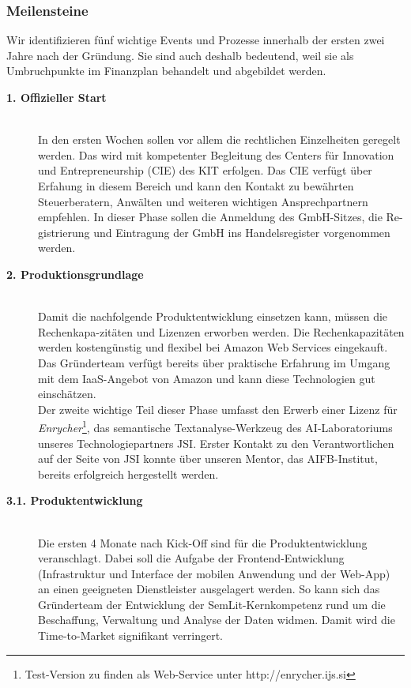 \subsubsection{Meilensteine}
Wir identifizieren fünf wichtige Events und Prozesse innerhalb der ersten zwei Jahre nach der Gründung. Sie sind auch deshalb bedeutend, weil sie als Umbruchpunkte im Finanzplan behandelt und abgebildet werden.\\
\begin{description}
  \item[\textbf{1. Offizieller Start}] \hfill \\
In den ersten Wochen sollen vor allem die rechtlichen Einzelheiten geregelt werden. Das wird mit kompetenter Begleitung des Centers für Innovation und Entrepreneurship (CIE) des KIT erfolgen. Das CIE verfügt über Erfahung in diesem Bereich und kann den Kontakt zu bewährten Steuerberatern, Anwälten und weiteren wichtigen Ansprechpartnern empfehlen. In dieser Phase sollen die Anmeldung des GmbH-Sitzes, die Re-gistrierung und Eintragung der GmbH ins Handelsregister vorgenommen werden. 
\\
  \item[\textbf{2. Produktionsgrundlage}] \hfill \\
Damit die nachfolgende Produktentwicklung einsetzen kann, müssen die Rechenkapa-zitäten und Lizenzen erworben werden. Die Rechenkapazitäten werden kostengünstig und flexibel bei {\color{orange}Amazon Web Services} eingekauft. Das Gründerteam verfügt bereits über praktische Erfahrung im Umgang mit dem IaaS-Angebot von Amazon und kann diese Technologien gut einschätzen. 
\\
Der zweite wichtige Teil dieser Phase umfasst den Erwerb einer Lizenz für \emph{Enrycher}\footnote[3]{Test-Version zu finden als Web-Service unter http://enrycher.ijs.si}, das semantische Textanalyse-Werkzeug des AI-Laboratoriums unseres Technologiepartners JSI. Erster Kontakt zu den Verantwortlichen auf der Seite von JSI konnte über unseren Mentor, das AIFB-Institut, bereits erfolgreich hergestellt werden.
\\
  \item[\textbf{3.1. Produktentwicklung}] \hfill \\
Die ersten 4 Monate nach Kick-Off sind für die Produktentwicklung veranschlagt. Dabei soll die Aufgabe der Frontend-Entwicklung (Infrastruktur und Interface der mobilen Anwendung und der Web-App) an einen geeigneten Dienstleister ausgelagert werden. So kann sich das Gründerteam der Entwicklung der SemLit-Kernkompetenz rund um die Beschaffung, Verwaltung und Analyse der Daten widmen. Damit wird die Time-to-Market signifikant verringert.  

\end{description}
